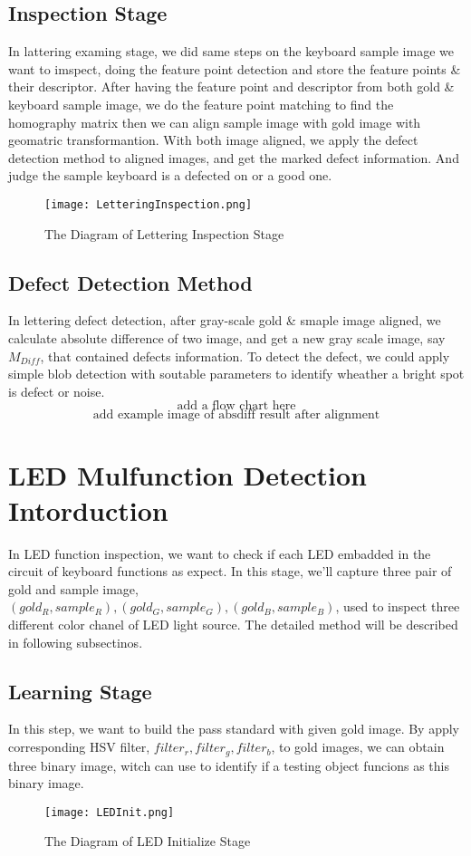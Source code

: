 	\subsection{Inspection Stage}
		In lattering examing stage, we did same steps on the keyboard sample image we want to imspect, doing the feature point detection and store the feature points \& their descriptor.
		After having the feature point and descriptor from both gold \& keyboard sample image, we do the feature point matching to find the homography matrix then we can align sample image with gold image with geomatric transformantion. 
		With both image aligned, we apply the defect detection method to aligned images, and get the marked defect information.
		And judge the sample keyboard is a defected on or a good one.
		\begin{figure}[h!]
			\texttt{[image: LetteringInspection.png]}
			\caption{The Diagram of Lettering Inspection Stage}
			\label{fig:LetteringInspection}
		\end{figure}

	\subsection{Defect Detection Method}
		In lettering defect detection, after gray-scale gold \& smaple image aligned, we calculate absolute difference of two image, and get a new gray scale image, say $M_{Diff}$, that contained defects information.
		To detect the defect, we could apply simple blob detection with soutable parameters to identify wheather a bright spot is defect or noise.
		$$ \textrm{add a flow chart here} $$
		$$ \textrm{add example image of absdiff result after alignment} $$

\section{LED Mulfunction Detection Intorduction}
	In LED function inspection, we want to check if each LED embadded in the circuit of keyboard functions as expect.
	In this stage, we'll capture three pair of gold and sample image, $(gold_R, sample_R), (gold_G, sample_G), (gold_B, sample_B)$, used to inspect three different color chanel of LED light source.
	The detailed method will be described in following subsectinos.
	\subsection{Learning Stage}
		In this step, we want to build the pass standard with given gold image.
		By apply corresponding HSV filter, $filter_r, filter_g, filter_b$, to gold images, we can obtain three binary image, witch can use to identify if a testing object funcions as this binary image.
		\begin{figure}[h!]
			\texttt{[image: LEDInit.png]}
			\caption{The Diagram of LED Initialize Stage}
			\label{fig:LEDInit}
		\end{figure}

